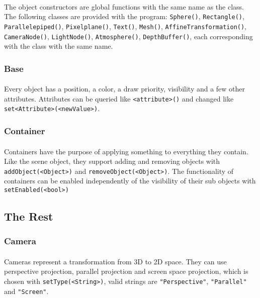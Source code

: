 \paragraph{}
The object constructors are global functions with the same name as the class.
The following classes are provided with the program:
\texttt{Sphere()}, \texttt{Rectangle()}, \texttt{Parallelepiped()}, \texttt{Pixelplane()}, \texttt{Text()}, \texttt{Mesh()}, \texttt{AffineTransformation()}, \texttt{CameraNode()}, \texttt{LightNode()}, \texttt{Atmosphere()}, \texttt{DepthBuffer()}, each corresponding with the class with the same name.

\subsubsection{Base}
\paragraph{}
Every object has a position, a color, a draw priority, visibility and a few other attributes.
Attributes can be queried like \texttt{<attribute>()} and changed like \texttt{set<Attribute>(<newValue>)}.

\subsubsection{Container}
\paragraph{}
Containers have the purpose of applying something to everything they contain.
Like the scene object, they support adding and removing objects with \texttt{addObject(<Object>)} and \texttt{removeObject(<Object>)}.
The functionality of containers can be enabled independently of the visibility of their sub objects with \texttt{setEnabled(<bool>)}

\subsection{The Rest}
\subsubsection{Camera}
\paragraph{}
Cameras represent a transformation from 3D to 2D space.
They can use perspective projection, parallel projection and screen space projection, which is chosen with \texttt{setType(<String>)}, valid strings are \texttt{"Perspective"}, \texttt{"Parallel"} and \texttt{"Screen"}.

